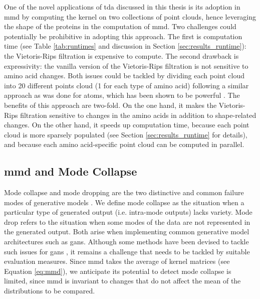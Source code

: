One of the novel applications of \gls{tda} discussed in this thesis is its
adoption in \gls{mmd} by computing the kernel on two collections of point
clouds, hence leveraging the shape of the proteins in the computation of \gls{mmd}.
Two challenges could potentially be prohibitive in adopting this approach. The
first is computation time (see Table \ref{tab:runtimes} and discussion in
Section \ref{sec:results_runtime}): the Vietoris-Rips filtration is expensive
to compute. The second drawback is expressivity: the vanilla version of the
Vietoris-Rips filtration is not sensitive to amino acid changes. Both issues
could be tackled by dividing each point cloud into 20 different points cloud (1
for each type of amino acid) following a similar approach as was done for atoms,
which has been shown to be powerful \citep{jiang2021topological}. The benefits
of this approach are two-fold. On the one hand, it makes the Vietoris-Rips
filtration sensitive to changes in the amino acids in addition to shape-related
changes. On the other hand, it speeds up computation time, because each point
cloud is more sparsely populated (see Section \ref{sec:results_runtime} for
details), and because each amino acid-specific point cloud can be computed in
parallel.


\subsection{\gls{mmd} and  Mode Collapse}\label{sec:mode_collapse_mode_drop}

Mode collapse and mode dropping are the two distinctive and common failure modes
of generative models \citep{salimans2016improved}. We define mode collapse as
the situation when a particular type of generated output (i.e. intra-mode
outputs) lacks variety. Mode drop refers to the situation when some modes of the
data are not represented in the generated output. Both arise when implementing
common generative model architectures such as \acrshort{gans}. Although some
methods have been devised to tackle such issues for \acrshort{gans}
\citep{arjovsky2017wasserstein, goodfellow2014generative}, it remains a
challenge that needs to be tackled by suitable evaluation measures. Since
\gls{mmd} takes the average of kernel matrices (see Equation \ref{eq:mmd}),
we anticipate its potential to detect mode collapse is limited, since
\gls{mmd} is invariant to changes that do not affect the mean of the
distributions to be compared.

